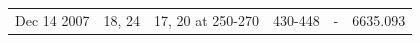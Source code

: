 \documentclass[a4paper,12pt]{article}
\begin{document}
\begin{table}
\begin{tabular}{rrrrrr}
                                                                                                                                                                                                                                                                                                                                                                                                                                                                                                                                                                                                                                                                                                                                                                                                                                                                                                                                                                                                                                                                                                                                                                                                                                         Dec 14 2007 & 18, 24 & 17, 20 at 250-270 & 430-448 & -     & 6635.093 \\

\end{tabular}
\end{table}
\end{document}
